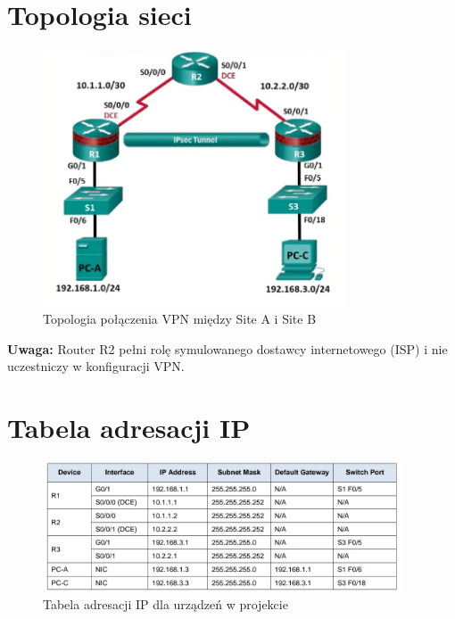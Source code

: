 \documentclass[12pt,twoside,a4paper,openany]{article}
\begin{document}
\section{Topologia sieci}
\begin{figure}[h!]
\centering
\includegraphics[width=0.8\textwidth]{rys/Screenshot From 2025-06-09 18-29-04.png}
\caption{Topologia połączenia VPN między Site A i Site B}
\label{fig:vpn_topology}
\end{figure}
\textbf{Uwaga:} Router R2 pełni rolę symulowanego dostawcy internetowego (ISP) i nie uczestniczy w konfiguracji VPN.

\section{Tabela adresacji IP}
\begin{figure}[h!]
    \centering
    \includegraphics[width=0.95\textwidth]{rys/adresy.png}
    \caption{Tabela adresacji IP dla urządzeń w projekcie}
    \label{fig:adresacja_ip}
\end{figure}
\end{document}
